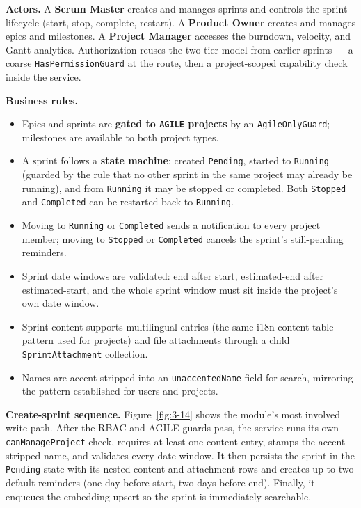\textbf{Actors.} A \textbf{Scrum Master} creates and manages sprints and controls the sprint
lifecycle (start, stop, complete, restart). A \textbf{Product Owner} creates and manages epics and
milestones. A \textbf{Project Manager} accesses the burndown, velocity, and Gantt analytics.
Authorization reuses the two-tier model from earlier sprints --- a coarse
\texttt{HasPermissionGuard} at the route, then a project-scoped capability check inside the
service.

\textbf{Business rules.}
\begin{itemize}
  \item Epics and sprints are \textbf{gated to \texttt{AGILE} projects} by an
    \texttt{AgileOnlyGuard}; milestones are available to both project types.
  \item A sprint follows a \textbf{state machine}: created \texttt{Pending}, started to
    \texttt{Running} (guarded by the rule that no other sprint in the same project may already be
    running), and from \texttt{Running} it may be stopped or completed. Both \texttt{Stopped} and
    \texttt{Completed} can be restarted back to \texttt{Running}.
  \item Moving to \texttt{Running} or \texttt{Completed} sends a notification to every project
    member; moving to \texttt{Stopped} or \texttt{Completed} cancels the sprint's still-pending
    reminders.
  \item Sprint date windows are validated: end after start, estimated-end after estimated-start,
    and the whole sprint window must sit inside the project's own date window.
  \item Sprint content supports multilingual entries (the same i18n content-table pattern used for
    projects) and file attachments through a child \texttt{SprintAttachment} collection.
  \item Names are accent-stripped into an \texttt{unaccentedName} field for search, mirroring the
    pattern established for users and projects.
\end{itemize}

\textbf{Create-sprint sequence.} Figure~\ref{fig:3-14} shows the module's most involved write
path. After the RBAC and AGILE guards pass, the service runs its own \texttt{canManageProject}
check, requires at least one content entry, stamps the accent-stripped name, and validates every
date window. It then persists the sprint in the \texttt{Pending} state with its nested content and
attachment rows and creates up to two default reminders (one day before start, two days before
end). Finally, it enqueues the embedding upsert so the sprint is immediately searchable.

